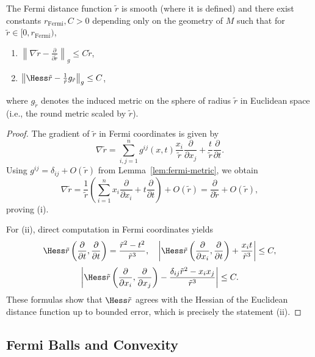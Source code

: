 \begin{lemma}\label{lem:fermi-distance-estimates}
The Fermi distance function $\tilde r$ is smooth (where it is defined) and there exist constants
$r_{\mathrm{Fermi}},C>0$ depending only on the geometry of $M$ such that for
$\tilde r \in [0,r_{\mathrm{Fermi}})$,
\begin{enumerate}[label=(\roman*)]
\item $\left\|\nabla \tilde r - \frac{\partial}{\partial \tilde r}\right\|_g \leq C \tilde r$,
\item $\left\| \Hess \tilde r - \frac{1}{\tilde r} g_{\tilde r} \right\|_g \leq C$,
\end{enumerate}
where $g_{\tilde r}$ denotes the induced metric on the sphere of radius $\tilde r$ in Euclidean
space (i.e., the round metric scaled by $\tilde r$).
\end{lemma}

\begin{proof}
The gradient of $\tilde r$ in Fermi coordinates is given by
\begin{equation}\label{eq:grad-fermi-distance}
\nabla \tilde r = \sum_{i,j=1}^n g^{ij}(x,t) \frac{x_i}{\tilde r} \frac{\partial}{\partial x_j}
+\frac{t}{\tilde r} \frac{\partial}{\partial t}.
\end{equation}
Using $g^{ij}=\delta_{ij}+O(\tilde r)$ from Lemma~\ref{lem:fermi-metric}, we obtain
\[
\nabla \tilde r = \frac{1}{\tilde r}\left(\sum_{i=1}^n x_i \frac{\partial}{\partial x_i}
+ t \frac{\partial}{\partial t}\right) + O(\tilde r)
= \frac{\partial}{\partial \tilde r} + O(\tilde r),
\]
proving (i).

For (ii), direct computation in Fermi coordinates yields
\[
\Hess \tilde r \left(\frac{\partial}{\partial t}, \frac{\partial}{\partial t}\right)
= \frac{\tilde r^2-t^2}{\tilde r^3}, \quad
\left| \Hess \tilde r \left(\frac{\partial}{\partial x_i}, \frac{\partial}{\partial t}\right)
+ \frac{x_i t}{\tilde r^3} \right| \leq C,
\]
\[
\left| \Hess \tilde r \left(\frac{\partial}{\partial x_i}, \frac{\partial}{\partial x_j}\right)
- \frac{\delta_{ij} \tilde r^2-x_i x_j}{\tilde r^3}\right| \leq C.
\]
These formulas show that $\Hess \tilde r$ agrees with the Hessian of the Euclidean distance
function up to bounded error, which is precisely the statement (ii).
\end{proof}

\subsection{Fermi Balls and Convexity}


